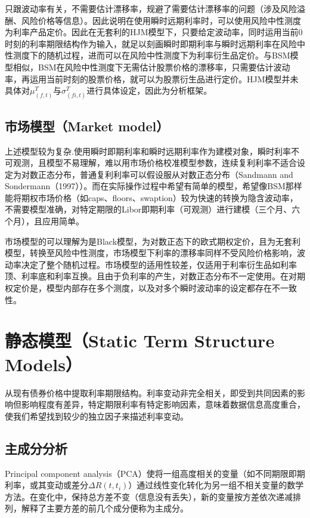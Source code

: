 \documentclass[11pt]{article}
\begin{document}
只跟波动率有关，不需要估计漂移率，规避了需要估计漂移率的问题（涉及风险溢酬、风险价格等信息）。因此说明在使用瞬时远期利率时，可以使用风险中性测度为利率产品定价。因此在无套利的HJM模型下，只要给定波动率，同时运用当前0时刻的利率期限结构作为输入，就足以刻画瞬时即期利率与瞬时远期利率在风险中性测度下的随机过程，进而可以在风险中性测度下为利率衍生品定价。与BSM模型相似，BSM在风险中性测度下无需估计股票价格的漂移率，只需要估计波动率，再运用当前时刻的股票价格，就可以为股票衍生品进行定价。HJM模型并未具体对$\mu_(f,t)^T$与$\sigma_(fi,t)^T$进行具体设定，因此为分析框架。

\subsection{市场模型（Market model）}

上述模型较为复杂.使用瞬时即期利率和瞬时远期利率作为建模对象，瞬时利率不可观测，且模型不易理解，难以用市场价格校准模型参数，连续复利利率不适合设定为对数正态分布，普通复利利率可以假设服从对数正态分布（Sandmann and Sondermann（1997））。而在实际操作过程中希望有简单的模型，希望像BSM那样能将期权市场价格（如caps、floors、swaption）较为快速的转换为隐含波动率，不需要模型准确，对特定期限的Libor即期利率（可观测）进行建模（三个月、六个月），且应用简单。

市场模型的可以理解为是Black模型，为对数正态下的欧式期权定价，且为无套利模型，转换至风险中性测度，市场模型下利率的漂移率同样不受风险价格影响，波动率决定了整个随机过程。市场模型的适用性较差，仅适用于利率衍生品如利率顶、利率底和利率互换。且由于负利率的产生，对数正态分布不一定使用。在对期权定价是，模型内部存在多个测度，以及对多个瞬时波动率的设定都存在不一致性。

\section{静态模型（Static Term Structure Models）}

从现有债券价格中提取利率期限结构。利率变动非完全相关，即受到共同因素的影响但影响程度有差异，特定期限利率有特定影响因素，意味着数据信息高度重合，使我们希望找到较少的独立因子来描述利率变动。

\subsection{主成分分析}

Principal component analysis（PCA）使将一组高度相关的变量（如不同期限即期利率，或其变动或差分$\Delta R(t,t_i)$）通过线性变化转化为另一组不相关变量的数学方法。在变化中，保持总方差不变（信息没有丢失），新的变量按方差依次递减排列，解释了主要方差的前几个成分便称为主成分。
\end{document}
